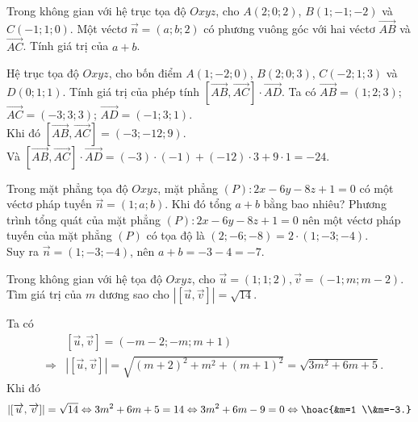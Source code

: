 \begin{ex}%
	Trong không gian với hệ trục tọa độ $Oxyz$, cho $A(2; 0; 2)$, $B(1;-1;-2)$ và $C(-1; 1; 0)$. Một véctơ $\overrightarrow{n}=(a; b; 2)$ có phương vuông góc với hai véctơ $\overrightarrow{AB}$ và $\overrightarrow{AC}$. Tính giá trị của $a+b$.
\end{ex}

\begin{ex}%
	Hệ trục tọa độ $Oxyz$, cho bốn điểm $A(1;-2; 0)$, $B(2; 0; 3)$, $C(-2; 1; 3)$ và $D(0; 1; 1)$. Tính giá trị của phép tính $\left[\overrightarrow{AB}, \overrightarrow{AC}\right] \cdot \overrightarrow{AD}$.
	\loigiai
	{
		Ta có $\overrightarrow{AB}=(1; 2; 3)$; $\overrightarrow{AC}=(-3; 3; 3)$; $\overrightarrow{A D}=(-1; 3; 1)$.\\
		Khi đó $\left[\overrightarrow{A B}, \overrightarrow{A C}\right]=(-3;-12; 9)$.\\
		Và $\left[\overrightarrow{A B}, \overrightarrow{A C}\right] \cdot \overrightarrow{A D}=(-3) \cdot(-1)+(-12) \cdot 3+9 \cdot 1=-24$.
	}
\end{ex}
\begin{ex}%
	Trong mặt phẳng tọa độ $O x y z$, mặt phẳng $(P)\colon 2 x-6 y-8 z+1=0$ có một véctơ pháp tuyến $\vec{n}=(1;a;b)$. Khi đó tổng $a+b$ bằng bao nhiêu? 
	\loigiai
	{
		Phương trình tổng quát của mặt phẳng $(P)\colon 2 x-6 y-8 z+1=0$ nên một véctơ pháp tuyến của mặt phẳng $(P)$ có tọa độ là $(2;-6;-8)=2\cdot (1;-3;-4)$.\\
		Suy ra $\vec{n}=(1;-3;-4)$, nên $a+b=-3-4=-7$.	
	}
\end{ex}

\begin{ex}%
	Trong không gian với hệ tọa độ $O x y z$, cho $\overrightarrow{u}=(1; 1; 2), \overrightarrow{v}=(-1; m; m-2)$. Tìm giá trị của $m$ dương sao cho $|[\overrightarrow{u}, \overrightarrow{v}]|=\sqrt{14}$.
	\loigiai
	{ Ta có {\allowdisplaybreaks
			\begin{eqnarray*}
				&& [\overrightarrow{u}, \overrightarrow{v}]=(-m-2;-m; m+1)\\ &\Rightarrow& |[\overrightarrow{u}, \overrightarrow{v}]|=\sqrt{(m+2)^2+m^2+(m+1)^2}=\sqrt{3 m^2+6 m+5}.
		\end{eqnarray*}}
		Khi đó $$|[\overrightarrow{u}, \overrightarrow{v}]|=\sqrt{14} \Leftrightarrow 3 m^2+6 m+5=14 \Leftrightarrow 3 m^2+6 m-9=0 \Leftrightarrow \hoac{&m=1 \\&m=-3.}$$
		
	}
\end{ex}

